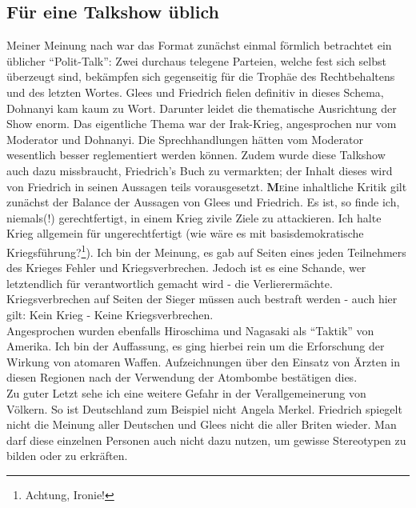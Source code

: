 \documentclass[paper=a4, fontsize=11pt]{article}
\begin{document}
\subsection{Für eine Talkshow üblich}
Meiner Meinung nach war das Format zunächst einmal förmlich betrachtet ein üblicher ``Polit-Talk'': Zwei durchaus telegene Parteien, welche fest sich selbst überzeugt sind, bekämpfen sich gegenseitig für die Trophäe des Rechtbehaltens und des letzten Wortes. Glees und Friedrich fielen definitiv in dieses Schema, Dohnanyi kam kaum zu Wort. Darunter leidet die thematische Ausrichtung der Show enorm. Das eigentliche Thema war der Irak-Krieg, angesprochen nur vom Moderator und Dohnanyi. Die Sprechhandlungen hätten vom Moderator wesentlich besser reglementiert werden können. Zudem wurde diese Talkshow auch dazu missbraucht, Friedrich's Buch zu vermarkten; der Inhalt dieses wird von Friedrich in seinen Aussagen teils vorausgesetzt.
\newline
\lettrine[nindent=0em,lines=2]{\textbf{M}}eine inhaltliche Kritik gilt zunächst der Balance der Aussagen von Glees und Friedrich. Es ist, so finde ich, niemals(!) gerechtfertigt, in einem Krieg zivile Ziele zu attackieren. Ich halte Krieg allgemein für ungerechtfertigt (wie wäre es mit basisdemokratische Kriegsführung?\footnote{Achtung, Ironie!}). Ich bin der Meinung, es gab auf Seiten eines jeden Teilnehmers des Krieges Fehler und Kriegsverbrechen. Jedoch ist es eine Schande, wer letztendlich für verantwortlich gemacht wird - die Verlierermächte. Kriegsverbrechen auf Seiten der Sieger müssen auch bestraft werden - auch hier gilt: Kein Krieg - Keine Kriegsverbrechen.  \\
Angesprochen wurden ebenfalls Hiroschima und Nagasaki als ``Taktik'' von Amerika. Ich bin der Auffassung, es ging hierbei rein um die Erforschung der Wirkung von atomaren Waffen. Aufzeichnungen über den Einsatz von Ärzten in diesen Regionen nach der Verwendung der Atombombe bestätigen dies. \\
Zu guter Letzt sehe ich eine weitere Gefahr in der Verallgemeinerung von Völkern. So ist Deutschland zum Beispiel nicht Angela Merkel. Friedrich spiegelt nicht die Meinung aller Deutschen und Glees nicht die aller Briten wieder. Man darf diese einzelnen Personen auch nicht dazu nutzen, um gewisse Stereotypen zu bilden oder zu erkräften.
\end{document}
